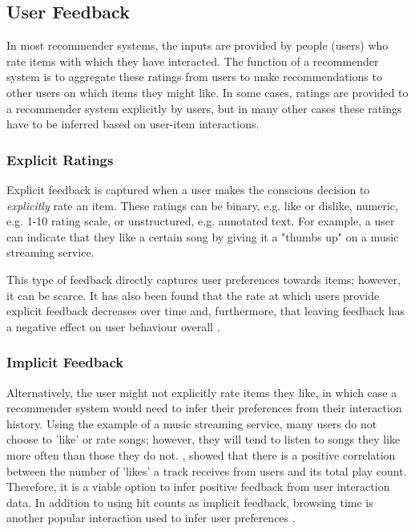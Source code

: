 \subsection{User Feedback}
 In most recommender systems, the inputs are provided by people (users) who rate items with which they have interacted. The function of a recommender system is to aggregate these ratings from users to make recommendations to other users on which items they might like. In some cases, ratings are provided to a recommender system explicitly by users, but in many other cases these ratings have to be inferred based on user-item interactions. 

\subsubsection{Explicit Ratings}
Explicit feedback is captured when a user makes the conscious decision to \textit{explicitly} rate an item. These ratings can be binary, e.g. like or dislike, numeric, e.g. 1-10 rating scale, or unstructured, e.g. annotated text. For example, a user can indicate that they like a certain song by giving it a "thumbs up" on a music streaming service.

This type of feedback directly captures user preferences towards items; however, it can be scarce. It has also been found that the rate at which users provide explicit feedback decreases over time and, furthermore, that leaving feedback has a negative effect on user behaviour overall \parencite{cf_1.5_explicit}.

\subsubsection{Implicit Feedback}
Alternatively, the user might not explicitly rate items they like, in which case a recommender system would need to infer their preferences from their interaction history. Using the example of a music streaming service, many users do not choose to 'like' or rate songs; however, they will tend to listen to songs they like more often than those they do not. \cite{cf_1.5_explicit}, showed that there is a positive correlation between the number of 'likes' a track receives from users and its total play count. Therefore, it is a viable option to infer positive feedback from user interaction data. In addition to using hit counts as implicit feedback, browsing time is another popular interaction used to infer user preferences \parencite{rs_1.1_Resnick}.

